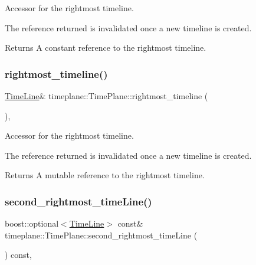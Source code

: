 Accessor for the rightmost timeline. 

The reference returned is invalidated once a new timeline is created. \begin{DoxyReturn}{Returns}
A constant reference to the rightmost timeline. 
\end{DoxyReturn}
\mbox{\label{classtimeplane_1_1_time_plane_a317c9e247011cf5f4e6e36f2f7651932}} 
\subsubsection{\texorpdfstring{rightmost\+\_\+timeline()}{rightmost\_timeline()}\hspace{0.1cm}{\footnotesize\ttfamily [2/2]}}
{\footnotesize\ttfamily \hyperlink{classtimeplane_1_1_time_line}{Time\+Line}\& timeplane\+::\+Time\+Plane\+::rightmost\+\_\+timeline (\begin{DoxyParamCaption}{ }\end{DoxyParamCaption})\hspace{0.3cm}{\ttfamily [inline]}, {\ttfamily [noexcept]}}



Accessor for the rightmost timeline. 

The reference returned is invalidated once a new timeline is created. \begin{DoxyReturn}{Returns}
A mutable reference to the rightmost timeline. 
\end{DoxyReturn}
\mbox{\label{classtimeplane_1_1_time_plane_aa7c579aa9eda4aebd505ff8b473a3be4}} 
\subsubsection{\texorpdfstring{second\+\_\+rightmost\+\_\+time\+Line()}{second\_rightmost\_timeLine()}}
{\footnotesize\ttfamily boost\+::optional$<$\hyperlink{classtimeplane_1_1_time_line}{Time\+Line}$>$ const\& timeplane\+::\+Time\+Plane\+::second\+\_\+rightmost\+\_\+time\+Line (\begin{DoxyParamCaption}{ }\end{DoxyParamCaption}) const\hspace{0.3cm}{\ttfamily [inline]}, {\ttfamily [noexcept]}}



